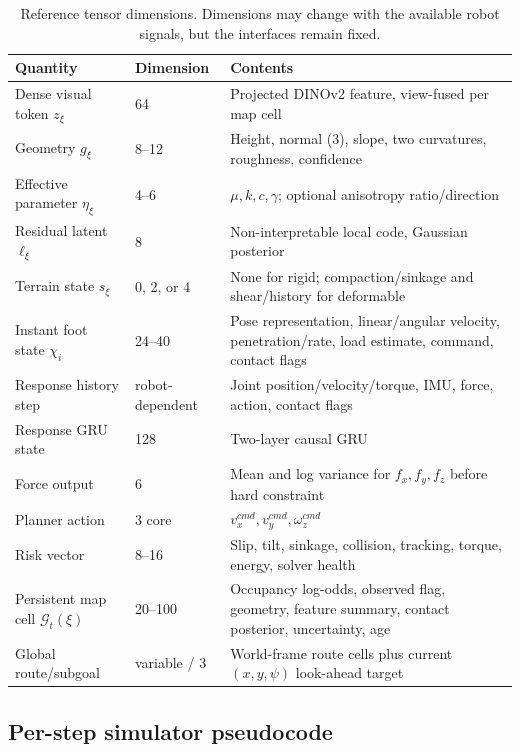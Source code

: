 \begin{table}[ht]
\centering
\caption{Reference tensor dimensions. Dimensions may change with the available robot signals, but the interfaces remain fixed.}
\label{tab:tensors}
\small
\begin{tabularx}{\textwidth}{@{}L{31mm}C{25mm}Y@{}}
\toprule
\textbf{Quantity} & \textbf{Dimension} & \textbf{Contents}\\
\midrule
Dense visual token $z_\xi$ & 64 & Projected DINOv2 feature, view-fused per map cell\\
Geometry $g_\xi$ & 8--12 & Height, normal (3), slope, two curvatures, roughness, confidence\\
Effective parameter $\eta_\xi$ & 4--6 & $\mu,k,c,\gamma$; optional anisotropy ratio/direction\\
Residual latent $\ell_\xi$ & 8 & Non-interpretable local code, Gaussian posterior\\
Terrain state $s_\xi$ & 0, 2, or 4 & None for rigid; compaction/sinkage and shear/history for deformable\\
Instant foot state $\chi_i$ & 24--40 & Pose representation, linear/angular velocity, penetration/rate, load estimate, command, contact flags\\
Response history step & robot-dependent & Joint position/velocity/torque, IMU, force, action, contact flags\\
Response GRU state & 128 & Two-layer causal GRU\\
Force output & 6 & Mean and log variance for $f_x,f_y,f_z$ before hard constraint\\
Planner action & 3 core & $v_x^{cmd},v_y^{cmd},\omega_z^{cmd}$\\
Risk vector & 8--16 & Slip, tilt, sinkage, collision, tracking, torque, energy, solver health\\
Persistent map cell $\mathcal G_t(\xi)$ & 20--100 & Occupancy log-odds, observed flag, geometry, feature summary, contact posterior, uncertainty, age\\
Global route/subgoal & variable / 3 & World-frame route cells plus current $(x,y,\psi)$ look-ahead target\\
\bottomrule
\end{tabularx}
\end{table}

\subsection{Per-step simulator pseudocode}

